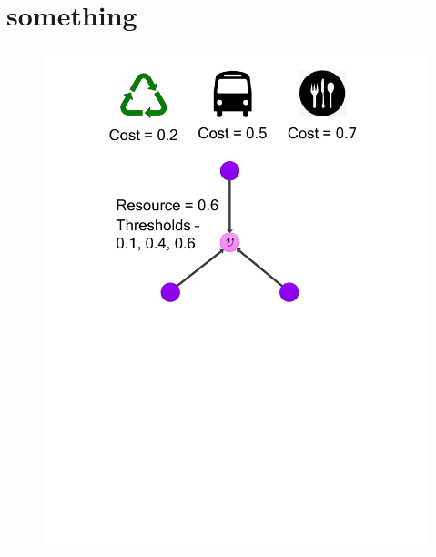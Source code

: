 \documentclass{article}
\begin{document}
\section{something}

\begin{figure}[htb]
\parbox{.3\linewidth}{
\includegraphics[viewport=1.25in 4in 7in 11in, width=\linewidth]{figs/timeline-1a}}%
\hspace{.2\linewidth}%
\parbox[][][t]{.3\linewidth}{%
}
\parbox{.3\linewidth}{
}
\end{figure}
\end{document}
